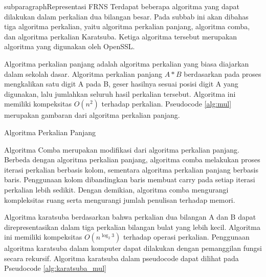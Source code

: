     subparagraph{Representasi FRNS}
    Terdapat beberapa algoritma yang dapat dilakukan dalam perkalian dua bilangan besar. Pada subbab ini akan dibahas tiga algoritma perkalian, yaitu algoritma perkalian panjang, algoritma comba, dan algoritma perkalian Karatsuba. Ketiga algoritma tersebut merupakan algoritma yang digunakan oleh OpenSSL.

    Algoritma perkalian panjang adalah algoritma perkalian yang biasa diajarkan dalam sekolah dasar. Algoritma perkalian panjang $A*B$ berdasarkan pada proses mengkalikan satu digit A pada B, geser hasilnya sesuai posisi digit A yang digunakan, lalu jumlahkan seluruh hasil perkalian tersebut. Algoritma ini memiliki kompeksitas $O(n^2)$ terhadap perkalian. Pseudocode \ref{alg:mul} merupakan gambaran dari algoritma perkalian panjang.

    \begin{algorithm}
      \caption{Algoritma Perkalian Panjang}
        \label{alg:mul}
      \begin{algorithmic}[1]
        \Statex
            \EndFor
          \EndFor
          \State {}
        \EndFunction
      \end{algorithmic}
    \end{algorithm}

    Algoritma Comba merupakan modifikasi dari algoritma perkalian panjang. Berbeda dengan algoritma perkalian panjang, algoritma comba melakukan proses iterasi perkalian berbasis kolom, sementara algoritma perkalian panjang berbasis baris. Penggunaan kolom dibandingkan baris membuat carry pada setiap iterasi perkalian lebih sedikit. Dengan demikian, algoritma comba mengurangi kompleksitas ruang serta mengurangi jumlah penulisan terhadap memori.

    Algoritma karatsuba berdasarkan bahwa perkalian dua bilangan A dan B dapat direpresentasikan dalam tiga perkalian bilangan bulat yang lebih kecil. Algoritma ini memiliki kompeksitas $O(n^{\log_2 3})$ terhadap operasi perkalian. Penggunaan algoritma karatsuba dalam komputer dapat dilakukan dengan pemanggilan fungsi secara rekursif. Algoritma karatsuba dalam pseudocode dapat dilihat pada Pseudocode \ref{alg:karatsuba_mul}

